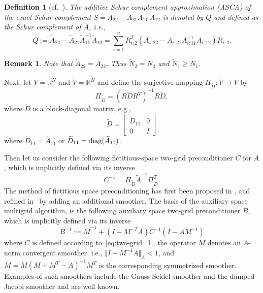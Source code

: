 \documentclass[11pt]{amsart}
\numberwithin{equation}{section}
\newtheorem{remark}{Remark}[section]
\newtheorem{definition}{Definition}[section]
\theoremstyle{definition}\newtheorem{example}{Example}[section]
\begin{document}
\begin{definition}[cf.~\cite{Kraus_12}]
The additive Schur complement approximation (ASCA) of the exact Schur complement
$S=A_{22} - A_{21} A_{11}^{-1} A_{12}$ is denoted by $Q$ and defined as the
Schur complement of
$\widetilde{A}$, i.e., 
$$Q:= \widetilde{A}_{22} - 
\widetilde{A}_{21} \widetilde{A}_{11}^{-1} \widetilde{A}_{12}
=\sum_{i=1}^{n} R_{{i}:2}^T (A_{{i}:22} - A_{{i}:21} 
A_{{i}:11}^{-1} A_{{i}:12}) R_{{i}:2}.
$$
\end{definition}
\begin{remark}
Note that $\widetilde{A}_{22}=A_{22}$. Thus $\widetilde{N}_2=N_2$ and $\widetilde{N}_1 \ge N_1$.
\end{remark}
Next, let $V={{\mathbb{R}}^{{N}}}$ and $\widetilde{V}={{\mathbb{R}}^{{\widetilde{N}}}}$ and
define the surjective mapping $\Pi_{\widetilde{D}}: \widetilde{V} \rightarrow V$ by 
\begin{equation}\label{eq:Pi}
\Pi_{\widetilde{D}}=(R \widetilde{D} R^T)^{-1} R \widetilde{D}, 
\end{equation}
where $\widetilde{D}$ is a block-diagonal matrix, e.g.,
\begin{equation}\label{eq:tilde_D}
\widetilde{D}=\left[
             \begin{array}{cc}
              \widetilde{D}_{11} & 0 \\
              0 & I
             \end{array}
           \right]
\end{equation}
where $\widetilde{D}_{11}=\widetilde{A}_{11}$ or
$\widetilde{D}_{11}={\rm diag}(\widetilde{A}_{11})$.

Then let us consider the following fictitious-space two-grid preconditioner
$C$ for $A$, which is implicitly defined via its inverse 
\begin{equation}\label{eq:two-grid_1}
C^{-1}=\Pi_{\widetilde{D}} \widetilde{A}^{-1} \Pi^T_{\widetilde{D}}. 
\end{equation}
The method of fictitious space preconditioning has first been  proposed in
  \cite{1985MatsokinA_NepomnyashchikhS-aa,Nepomnyaschikh1991mesh,
    nepomnyaschikh1995fictitious}, and refined
  in~\cite{Xu1996auxiliary} by adding an additional smoother. The
  basis of the  auxiliary space multigrid algorithm, is the following auxiliary
  space two-grid preconditioner $B$, which is implicitly defined via
  its inverse
\begin{equation}\label{eq:two-grid_3}
B^{-1} := \overline{M}^{-1} 
+ (I - M^{-T} A) C^{-1} (I - A M^{-1})  
\end{equation}
where $C$ is defined according to~\eqref{eq:two-grid_1}, the operator $M$
denotes an $A$-norm convergent smoother, i.e., $\Vert I-M^{-1}A\Vert_A
< 1$,  
and $\overline{M}=M(M+M^T-A)^{-1}M^T$ is the corresponding symmetrized
smoother. Examples of such smoothers include the Gauss-Seidel smoother and  
the damped Jacobi smoother and are well known. 
\end{document}
